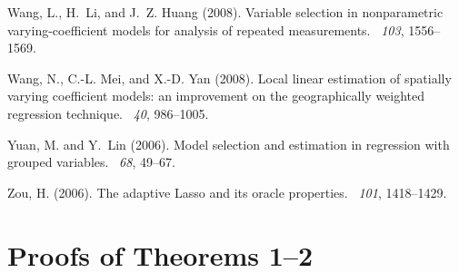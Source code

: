 \documentclass[authoryear,review, 12pt]{elsarticle}
\begin{document}
\begin{thebibliography}{}
Wang, L., H.~Li, and J.~Z. Huang (2008).
\newblock Variable selection in nonparametric varying-coefficient models for
  analysis of repeated measurements.
~{\em 103},
  1556--1569.

Wang, N., C.-L. Mei, and X.-D. Yan (2008).
\newblock Local linear estimation of spatially varying coefficient models: an
  improvement on the geographically weighted regression technique.
~{\em 40}, 986--1005.

Yuan, M. and Y.~Lin (2006).
\newblock Model selection and estimation in regression with grouped variables.
~{\em 68},
  49--67.

Zou, H. (2006).
\newblock The adaptive {L}asso and its oracle properties.
~{\em 101},
  1418--1429.

\end{thebibliography}

\clearpage

\appendix
\section{Proofs of Theorems 1--2}
\end{document}
